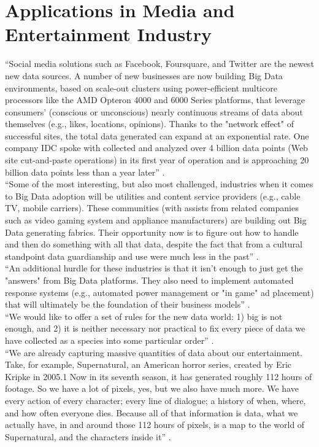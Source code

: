 \documentclass[sigconf]{acmart}
\begin{document}
\section{Applications in Media and Entertainment Industry}

``Social media solutions such as Facebook, Foursquare, and Twitter are the newest new data sources. A number of new businesses are now building Big Data environments, based on scale-out clusters using power-efficient multicore processors like the AMD Opteron 4000 and 6000 Series platforms, that leverage consumers' (conscious or unconscious) nearly continuous streams of data about themselves (e.g., likes, locations, opinions). Thanks to the "network effect" of successful sites, the total data generated can expand at an exponential rate. One company IDC spoke with collected and analyzed over 4 billion data points (Web site cut-and-paste operations) in its first year of operation and is approaching 20 billion data points less than a year later'' \cite{Villars2011care}. \\
``Some of the most interesting, but also most challenged, industries when it comes to Big Data adoption will be utilities and content service providers (e.g., cable TV, mobile carriers). These communities (with assists from related companies such as video gaming system and appliance manufacturers) are building out Big Data generating fabrics. Their opportunity now is to figure out how to handle and then do something with all that data, despite the fact that from a cultural standpoint data guardianship and use were much less in the past'' \cite{Villars2011care}. \\
``An additional hurdle for these industries is that it isn't enough to just get the "answers" from Big Data platforms. They also need to implement automated response systems (e.g., automated power management or "in game" ad placement) that will ultimately be the foundation of their business models'' \cite{Villars2011care}. \\
``We would like to offer a set of rules for the new data world: 1) big is not enough, and 2) it is neither necessary nor practical to fix every piece of data we have collected as a species into some particular order'' \cite{Schlieski2012data}. \\
``We are already capturing massive quantities of data about our entertainment. Take, for example, Supernatural, an American horror series, created by Eric Kripke in 2005.1 Now in its seventh season, it has generated roughly 112 hours of footage. So we have a lot of pixels, yes, but we also have much more. We have every action of every character; every line of dialogue; a history of when, where, and how often everyone dies. Because all of that information is data, what we actually have, in and around those 112 hours of pixels, is a map to the world of Supernatural, and the characters inside it'' \cite{Schlieski2012data}. \\
\end{document}

